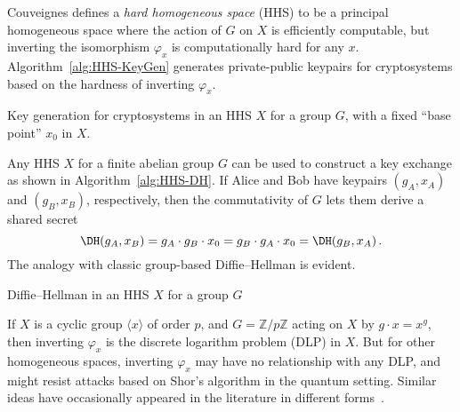 \documentclass{llncs}
\begin{document}
Couveignes defines a \emph{hard homogeneous space} (HHS) 
to be a principal homogeneous space 
where the action of $G$ on $X$ is efficiently computable, 
but inverting the isomorphism $φ_x$ is computationally hard for any $x$.
Algorithm~\ref{alg:HHS-KeyGen} generates private-public keypairs
for cryptosystems based on the hardness of inverting $\varphi_x$.

\begin{algorithm}
    \caption{Key generation for cryptosystems in an HHS $X$ for a
    group $G$, with a fixed ``base point'' $x_0$ in $X$.}
    \label{alg:HHS-KeyGen}
    \KwIn{()}
\end{algorithm}

Any HHS $X$ for a finite abelian group $G$ can be used to construct a
key exchange as shown in Algorithm~\ref{alg:HHS-DH}.
If Alice and Bob have keypairs $(g_A,x_A)$
and $(g_B,x_B)$, respectively,
then the commutativity of $G$
lets them derive a shared secret
\[
    \DH(g_A,x_B) 
    = g_A\cdot g_B\cdot x_0 
    = g_B\cdot g_A\cdot x_0
    = \DH(g_B,x_A)
    \,.
\]
The analogy with classic group-based Diffie--Hellman is evident.

\begin{algorithm}
    \caption{Diffie--Hellman in an HHS $X$ for a group $G$}
    \label{alg:HHS-DH}
\end{algorithm}




If $X$ is a
cyclic group $〈x〉$ of order $p$, and $G=ℤ/pℤ$ acting on $X$ by
$g·x=x^g$, then %
inverting $φ_x$ is the discrete logarithm problem (DLP) in $X$.
But for other homogeneous spaces, inverting $φ_x$ may have no relationship
with any DLP,
and might resist attacks based on Shor's algorithm in the quantum setting.
Similar ideas have occasionally appeared in the
literature in different forms~\cite{10.1007/3-540-44598-6_10,monico2007}.
\end{document}
